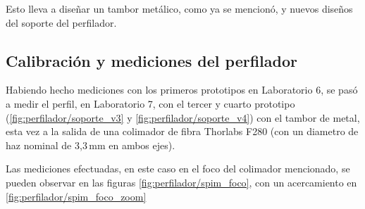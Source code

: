 Esto lleva a diseñar un tambor metálico, como ya se mencionó, y nuevos diseños del soporte del perfilador.

\subsection{Calibración y mediciones del perfilador}
Habiendo hecho mediciones con los primeros prototipos en Laboratorio 6, se pasó a medir el perfil, en Laboratorio 7, con el tercer y cuarto prototipo (\ref{fig:perfilador/soporte_v3} y \ref{fig:perfilador/soporte_v4}) con el tambor de metal, esta vez a la salida de una colimador de fibra Thorlabs F280\cite{thorlabs_fc} (con un diametro de haz nominal de 3,3$\,$mm en ambos ejes). 

Las mediciones efectuadas, en este caso en el foco del colimador mencionado, se pueden observar en las figuras \ref{fig:perfilador/spim_foco}, con un acercamiento en \ref{fig:perfilador/spim_foco_zoom}

